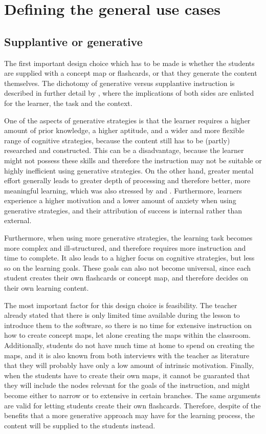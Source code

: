\chapter{Defining the general use cases}

\section{Supplantive or generative}

The first important design choice which has to be made is whether the students are supplied with a concept map or flashcards, or that they generate the content themselves. The dichotomy of generative versus supplantive instruction is described in further detail by , where the implications of both sides are enlisted for the learner, the task and the context.

One of the aspects of generative strategies is that the learner requires a higher amount of prior knowledge, a higher aptitude, and a wider and more flexible range of cognitive strategies, because the content still has to be (partly) researched and constructed. This can be a disadvantage, because the learner might not possess these skills and therefore the instruction may not be suitable or highly inefficient using generative strategies. On the other hand, greater mental effort generally leads to greater depth of processing and therefore better, more meaningful learning, which was also stressed by  and . Furthermore, learners experience a higher motivation and a lower amount of anxiety when using generative strategies, and their attribution of success is internal rather than external. 

Furthermore, when using more generative strategies, the learning task becomes more complex and ill-structured, and therefore requires more instruction and time to complete. It also leads to a higher focus on cognitive strategies, but less so on the learning goals. These goals can also not become universal, since each student creates their own flashcards or concept map, and therefore decides on their own learning content.

The most important factor for this design choice is feasibility. The teacher already stated that there is only limited time available during the lesson to introduce them to the software, so there is no time for extensive instruction on how to create concept maps, let alone creating the maps within the classroom. Additionally, students do not have much time at home to spend on creating the maps, and it is also known from both interviews with the teacher as literature that they will probably have only a low amount of intrinsic motivation. Finally, when the students have to create their own maps, it cannot be guaranted that they will include the nodes relevant for the goals of the instruction, and might become either to narrow or to extensive in certain branches. The same arguments are valid for letting students create their own flashcards. Therefore, despite of the benefits that a more generative approach may have for the learning process, the content will be supplied to the students instead.

